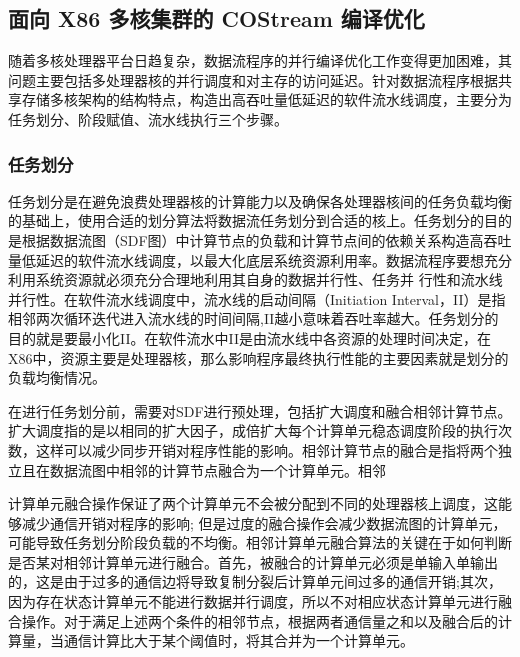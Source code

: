 \subsection{面向 X86 多核集群的 COStream 编译优化}

随着多核处理器平台日趋复杂，数据流程序的并行编译优化工作变得更加困难，其问题主要包括多处理器核的并行调度和对主存的访问延迟。针对数据流程序根据共享存储多核架构的结构特点，构造出高吞吐量低延迟的软件流水线调度，主要分为任务划分、阶段赋值、流水线执行三个步骤。

\subsubsection{任务划分}

任务划分是在避免浪费处理器核的计算能力以及确保各处理器核间的任务负载均衡的基础上，使用合适的划分算法将数据流任务划分到合适的核上。任务划分的目的是根据数据流图（SDF图）中计算节点的负载和计算节点间的依赖关系构造高吞吐量低延迟的软件流水线调度，以最大化底层系统资源利用率。数据流程序要想充分利用系统资源就必须充分合理地利用其自身的数据并行性、任务并 行性和流水线并行性。在软件流水线调度中，流水线的启动间隔（Initiation Interval，II）是指相邻两次循环迭代进入流水线的时间间隔,II越小意味着吞吐率越大。任务划分的目的就是要最小化II。在软件流水中II是由流水线中各资源的处理时间决定，在X86中，资源主要是处理器核，那么影响程序最终执行性能的主要因素就是划分的负载均衡情况。

在进行任务划分前，需要对SDF进行预处理，包括扩大调度和融合相邻计算节点。扩大调度指的是以相同的扩大因子，成倍扩大每个计算单元稳态调度阶段的执行次数，这样可以减少同步开销对程序性能的影响。相邻计算节点的融合是指将两个独立且在数据流图中相邻的计算节点融合为一个计算单元。相邻

计算单元融合操作保证了两个计算单元不会被分配到不同的处理器核上调度，这能够减少通信开销对程序的影响; 但是过度的融合操作会减少数据流图的计算单元，可能导致任务划分阶段负载的不均衡。相邻计算单元融合算法的关键在于如何判断是否某对相邻计算单元进行融合。首先，被融合的计算单元必须是单输入单输出的，这是由于过多的通信边将导致复制分裂后计算单元间过多的通信开销;其次，因为存在状态计算单元不能进行数据并行调度，所以不对相应状态计算单元进行融合操作。对于满足上述两个条件的相邻节点，根据两者通信量之和以及融合后的计算量，当通信计算比大于某个阈值时，将其合并为一个计算单元。

